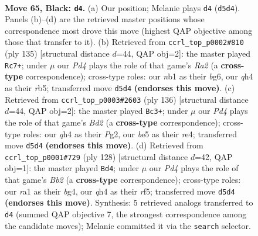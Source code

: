 \documentclass[11pt]{article}
\begin{document}
\clearpage

\begin{figure}[p]\centering
\begin{subfigure}{0.46\textwidth}\centering
\resizebox{\linewidth}{!}{%
\newchessgame
\chessboard[
  setfen={8/1k6/8/p2pBp2/P6Q/8/8/RN4K1 b - - 0 65},
  showmover=false,
  pgfstyle=straightmove, color=movearrow, markmove={d5-d4}
]}
\caption{}
\end{subfigure}\hfill
\begin{subfigure}{0.46\textwidth}\centering
\resizebox{\linewidth}{!}{%
\newchessgame
\chessboard[
  setfen={8/r7/6Bp/1R5P/5k2/2K5/8/8 b - - 9 68},
  showmover=false,
  pgfstyle=straightmove, color=movearrow, markmove={a7-c7}
]}
\caption{}
\end{subfigure}
\\[4pt]
\begin{subfigure}{0.46\textwidth}\centering
\resizebox{\linewidth}{!}{%
\newchessgame
\chessboard[
  setfen={8/4b1k1/1R6/5p2/4r2p/7P/3B2P1/5K2 w - - 12 69},
  showmover=false,
  pgfstyle=straightmove, color=movearrow, markmove={d2-c3}
]}
\caption{}
\end{subfigure}\hfill
\begin{subfigure}{0.46\textwidth}\centering
\resizebox{\linewidth}{!}{%
\newchessgame
\chessboard[
  setfen={8/5k2/R7/5r1p/6bP/4K3/1B6/8 w - - 0 65},
  showmover=false,
  pgfstyle=straightmove, color=movearrow, markmove={b2-d4}
]}
\caption{}
\end{subfigure}
\caption{\textbf{Move 65, Black: \texttt{d4}.} (a) Our position; Melanie plays \texttt{d4} (\texttt{d5d4}). Panels (b)--(d) are the retrieved master positions whose correspondence most drove this move (highest QAP objective among those that transfer to it). (b) Retrieved from \texttt{ccrl\_top\_p0002\#810} (ply 135) [structural distance $d$=44, QAP obj=2]: the master played \texttt{Rc7+}; under $\mu$ our \emph{Pd4} plays the role of that game's \emph{Ra2} (a \textbf{cross-type} correspondence); cross-type roles: our \emph{n}b1 as their \emph{b}g6, our \emph{q}h4 as their \emph{r}b5; transferred move \texttt{d5d4} \textbf{(endorses this move)}. (c) Retrieved from \texttt{ccrl\_top\_p0003\#2603} (ply 136) [structural distance $d$=44, QAP obj=2]: the master played \texttt{Bc3+}; under $\mu$ our \emph{Pd4} plays the role of that game's \emph{Bd2} (a \textbf{cross-type} correspondence); cross-type roles: our \emph{q}h4 as their \emph{P}g2, our \emph{b}e5 as their \emph{r}e4; transferred move \texttt{d5d4} \textbf{(endorses this move)}. (d) Retrieved from \texttt{ccrl\_top\_p0001\#729} (ply 128) [structural distance $d$=42, QAP obj=1]: the master played \texttt{Bd4}; under $\mu$ our \emph{Pd4} plays the role of that game's \emph{Bb2} (a \textbf{cross-type} correspondence); cross-type roles: our \emph{r}a1 as their \emph{b}g4, our \emph{q}h4 as their \emph{r}f5; transferred move \texttt{d5d4} \textbf{(endorses this move)}. Synthesis: 5 retrieved analogs transferred to \texttt{d4} (summed QAP objective 7, the strongest correspondence among the candidate moves); Melanie committed it via the \texttt{search} selector.}
\label{fig:thought-m129}
\end{figure}
\end{document}
